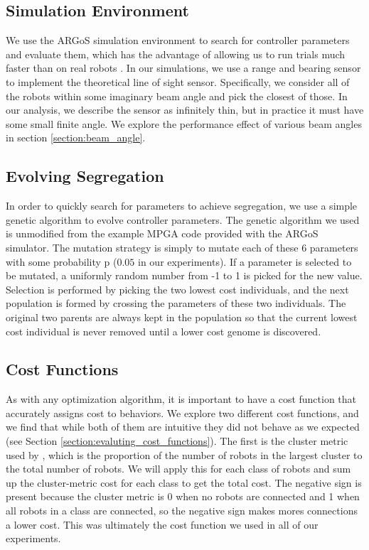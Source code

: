 \documentclass[conference]{IEEEtran}
\begin{document}
  \subsection{Simulation Environment}

    We use the ARGoS simulation environment to search for controller parameters and evaluate them, which has the advantage of allowing us to run trials much faster than on real robots \cite{pinciroli_argos:_2012}. In our simulations, we use a range and bearing sensor to implement the theoretical line of sight sensor. Specifically, we consider all of the robots within some imaginary beam angle and pick the closest of those. In our analysis, we describe the sensor as infinitely thin, but in practice it must have some small finite angle. We explore the performance effect of various beam angles in section \ref{section:beam_angle}.

  \subsection{Evolving Segregation}

    In order to quickly search for parameters to achieve segregation, we use a simple genetic algorithm to evolve controller parameters. The genetic algorithm we used is unmodified from the example MPGA code provided with the ARGoS simulator. The mutation strategy is simply to mutate each of these 6 parameters with some probability p ($0.05$ in our experiments). If a parameter is selected to be mutated, a uniformly random number from -1 to 1 is picked for the new value. Selection is performed by picking the two lowest cost individuals, and the next population is formed by crossing the parameters of these two individuals. The original two parents are always kept in the population so that the current lowest cost individual is never removed until a lower cost genome is discovered.

  \subsection{Cost Functions}

    As with any optimization algorithm, it is important to have a cost function that accurately assigns cost to behaviors. We explore two different cost functions, and we find that while both of them are intuitive they did not behave as we expected (see Section \ref{section:evaluting_cost_functions}). The first is the cluster metric used by \cite{gauci_self-organized_2014}, which is the proportion of the number of robots in the largest cluster to the total number of robots. We will apply this for each class of robots and sum up the cluster-metric cost for each class to get the total cost. The negative sign is present because the cluster metric is 0 when no robots are connected and 1 when all robots in a class are connected, so the negative sign makes mores connections a lower cost. This was ultimately the cost function we used in all of our experiments.
\end{document}
